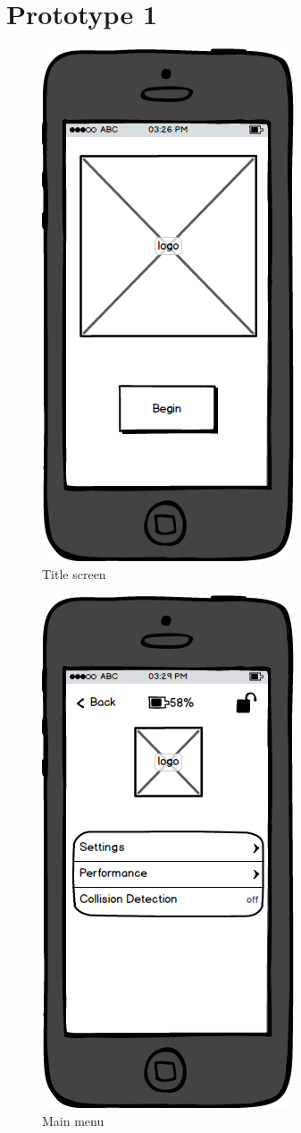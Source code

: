 \documentclass[a4paper]{report}
\begin{document}
\chapter{Prototype 1}
\begin{figure}
\centering
\includegraphics[scale=0.9]{figures/prototype_1/title}
\caption{Title screen}
\end{figure}
\clearpage
\begin{figure}
\centering
\includegraphics[scale=0.9]{figures/prototype_1/main_menu}
\caption{Main menu}
\end{figure}
\end{document}
